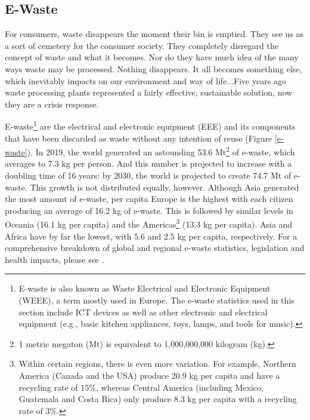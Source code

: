 \documentclass{article}
\begin{document}
\subsection{E-Waste} \label{SECTION_END_OF_LIFE_EMISSIONS}
 \begin{fquote}
 For consumers, waste disappears the moment their bin is emptied. They see us as a sort of cemetery for the consumer society. They completely disregard the concept of waste and what it becomes. Nor do they have much idea of the many ways waste may be processed. Nothing disappears. It all becomes something else, which inevitably impacts on our environment and way of life...Five years ago waste processing plants represented a fairly effective, sustainable solution, now they are a crisis response.
 \end{fquote}

E-waste\footnote{E-waste is also known as Waste Electrical and Electronic Equipment (WEEE), a term mostly used in Europe. The e-waste statistics used in this section include ICT devices as well as other electronic and electrical equipment (e.g., basic kitchen appliances, toys, lamps, and tools for music).} are the electrical and electronic equipment (EEE) and its components that have been discarded as waste without any intention of reuse (Figure \ref{e-waste}). In 2019, the world generated an astounding 53.6 Mt\footnote{1 metric megaton (Mt) is equivalent to 1,000,000,000 kilogram (kg).} of e-waste, which averages to 7.3 kg per person. And this number is projected to increase with a doubling time of 16 years: by 2030, the world is projected to create 74.7 Mt of e-waste. This growth is not distributed equally, however. Although Asia generated the most amount of e-waste, per capita Europe is the highest with each citizen producing an average of 16.2 kg of e-waste. This is followed by similar levels in Oceania (16.1 kg per capita) and the Americas\footnote{Within certain regions, there is even more variation. For example, Northern America (Canada and the USA) produce 20.9 kg per capita and have a recycling rate of 15\%, whereas Central America (including Mexico, Guatemala and Costa Rica) only produce 8.3 kg per capita with a recycling rate of 3\%.} (13.3 kg per capita). Asia and Africa have by far the lowest, with 5.6 and 2.5 kg per capita, respectively. For a comprehensive breakdown of global and regional e-waste statistics, legislation and health impacts, please see \cite{forti2020global}.
\end{document}
